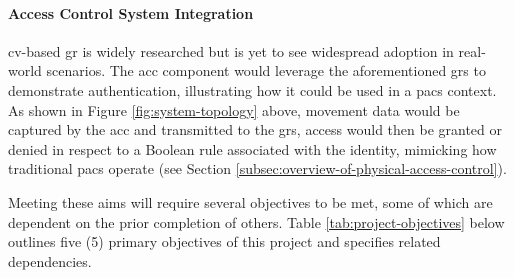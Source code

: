 \paragraph{Access Control System Integration} \ac{cv}-based \ac{gr} is widely researched but is yet to see widespread adoption in real-world scenarios.
The \ac{acc} component would leverage the aforementioned \ac{grs} to demonstrate authentication, illustrating how it could be used in a \ac{pacs} context.
As shown in Figure \ref{fig:system-topology} above, movement data would be captured by the \ac{acc} and transmitted to the \ac{grs}, access would then be granted or denied in respect to a Boolean rule associated with the identity, mimicking how traditional \ac{pacs} operate (see Section \ref{subsec:overview-of-physical-access-control}).

Meeting these aims will require several objectives to be met, some of which are dependent on the prior completion of others.
Table \ref{tab:project-objectives} below outlines five (5) primary objectives of this project and specifies related dependencies.

